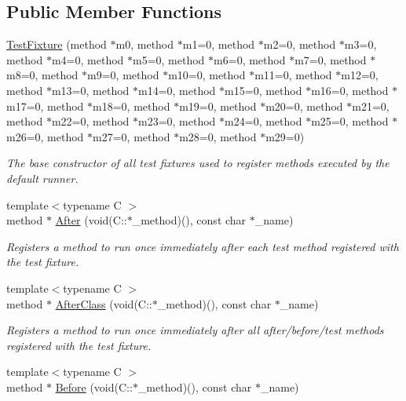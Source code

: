 \subsection*{Public Member Functions}
\begin{DoxyCompactItemize}
\item 
\mbox{\hyperlink{classtpunit_1_1TestFixture_ac5b58b65f604ea18f182ee5d25d6da64}{Test\+Fixture}} (method $\ast$m0, method $\ast$m1=0, method $\ast$m2=0, method $\ast$m3=0, method $\ast$m4=0, method $\ast$m5=0, method $\ast$m6=0, method $\ast$m7=0, method $\ast$m8=0, method $\ast$m9=0, method $\ast$m10=0, method $\ast$m11=0, method $\ast$m12=0, method $\ast$m13=0, method $\ast$m14=0, method $\ast$m15=0, method $\ast$m16=0, method $\ast$m17=0, method $\ast$m18=0, method $\ast$m19=0, method $\ast$m20=0, method $\ast$m21=0, method $\ast$m22=0, method $\ast$m23=0, method $\ast$m24=0, method $\ast$m25=0, method $\ast$m26=0, method $\ast$m27=0, method $\ast$m28=0, method $\ast$m29=0)
\begin{DoxyCompactList}\small\item\em The base constructor of all test fixtures used to register methods executed by the default runner. \end{DoxyCompactList}\item 
{\footnotesize template$<$typename C $>$ }\\method $\ast$ \mbox{\hyperlink{classtpunit_1_1TestFixture_a509cf528b20c220485c9d9bb509d8c8b}{After}} (void(C\+::$\ast$\+\_\+method)(), const char $\ast$\+\_\+name)
\begin{DoxyCompactList}\small\item\em Registers a method to run once immediately after each test method registered with the test fixture. \end{DoxyCompactList}\item 
{\footnotesize template$<$typename C $>$ }\\method $\ast$ \mbox{\hyperlink{classtpunit_1_1TestFixture_abdb01cd1b4a8ba87e1257a645824d3b0}{After\+Class}} (void(C\+::$\ast$\+\_\+method)(), const char $\ast$\+\_\+name)
\begin{DoxyCompactList}\small\item\em Registers a method to run once immediately after all after/before/test methods registered with the test fixture. \end{DoxyCompactList}\item 
{\footnotesize template$<$typename C $>$ }\\method $\ast$ \mbox{\hyperlink{classtpunit_1_1TestFixture_abe7e134b3e4eec637bd6b7975883027d}{Before}} (void(C\+::$\ast$\+\_\+method)(), const char $\ast$\+\_\+name)

\end{DoxyCompactItemize}
